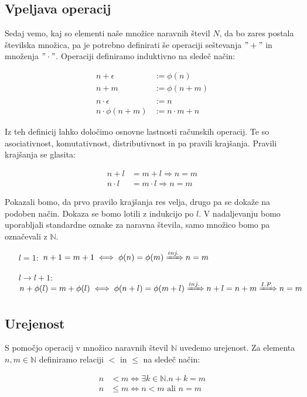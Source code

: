 \documentclass[12pt, a4paper]{article}
\begin{document}
\subsection{Vpeljava operacij}

Sedaj vemo, kaj so elementi naše množice naravnih števil $N$, da bo zares postala številska množica, pa je potrebno definirati še operaciji seštevanja $"+"$ in množenja $"\cdot"$. Operaciji definiramo induktivno na sledeč način:

\begin{align*}
n+\epsilon&:=\phi(n) \\
n+m&:=\phi(n+m)\\
&\\
n\cdot \epsilon &:= n \\
n\cdot \phi(n+m)&:=n\cdot m + n
\end{align*}

Iz teh definicij lahko določimo osnovne lastnosti računskih operacij. Te so asociativnost, komutativnost, distributivnost in pa pravili krajšanja. Pravili krajšanja se glasita:

\begin{align*}
 n+l &= m+l\Rightarrow n=m \\
n\cdot l &= m\cdot l \Rightarrow n=m
\end{align*}

Pokazali bomo, da prvo pravilo krajšanja res velja, drugo pa se dokaže na podoben način. Dokaza se bomo lotili z indukcijo po $l$. V nadaljevanju bomo uporabljali standardne oznake za naravna števila, samo množico bomo pa označevali z $\mathbb{N}$.

\begin{itemize}
\item[$l=1:$] $n+1 = m+1  \iff \phi(n) = \phi(m) \xRightarrow{inj.} n=m$ \checkmark
\item[$l\rightarrow l+1:$] $n+\phi(l)=m+\phi(l) \iff \phi(n+l) = \phi(m+l) \xRightarrow{inj.} n+l = n+m \xRightarrow{I.P.} n=m$ \checkmark
\end{itemize}

\subsection{Urejenost}

S pomočjo operacij v množico naravnih števil $\mathbb{N}$ uvedemo urejenost. Za elementa $n,m\in \mathbb{N}$ definiramo relaciji $<$ in $\leq$ na sledeč način:

\begin{align*}
n&<m \iff \exists k\in \mathbb{N}. n+k=m \\
n&\leq m \iff n<m\text{ ali }n=m
\end{align*}
\end{document}
